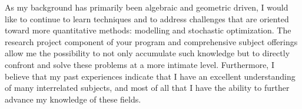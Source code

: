 \documentclass[11pt]{article}
\begin{document}
As my background has primarily been algebraic and geometric driven, I would like to continue to learn techniques and to address challenges that are oriented toward more quantitative methods: modelling and stochastic optimization. The research project component of your program and comprehensive subject offerings allow me the possibility to not only accumulate such knowledge but to directly confront and solve these problems at a more intimate level. Furthermore, I believe that my past experiences indicate that I have an excellent understanding of many interrelated subjects, and most of all that I have the ability to further advance my knowledge of these fields.

\end{document}
